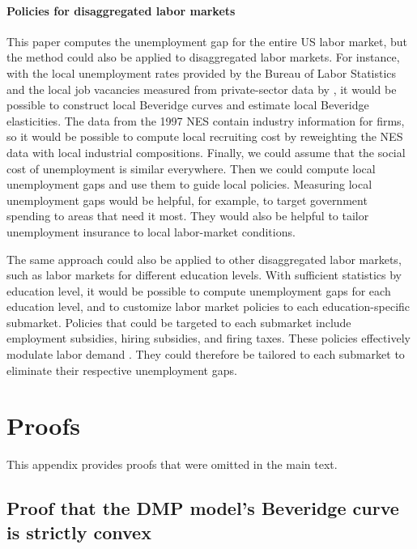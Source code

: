 \documentclass[letterpaper,12pt,leqno]{article}
\def\bib{../../bibliography/keynes.bib}
\begin{document}
\paragraph{Policies for disaggregated labor markets} This paper computes the unemployment gap for the entire US labor market, but the method could also be applied to disaggregated labor markets. For instance, with the local unemployment rates provided by the Bureau of Labor Statistics and the local job vacancies measured from private-sector data by , it would be possible to construct local Beveridge curves and estimate local Beveridge elasticities. The data from the 1997 NES contain industry information for firms, so it would be possible to compute local recruiting cost by reweighting the NES data with local industrial compositions. Finally, we could assume that the social cost of unemployment is similar everywhere. Then we could compute local unemployment gaps and use them to guide local policies. Measuring local unemployment gaps would be helpful, for example, to target government spending to areas that need it most. They would also be helpful to tailor  unemployment insurance to local labor-market conditions.

The same approach could also be applied to other disaggregated labor markets, such as labor markets for different education levels.  With sufficient statistics by education level, it would be possible to compute unemployment gaps for each education level, and to customize labor market policies to each education-specific submarket. Policies that could be targeted to each submarket include employment subsidies, hiring subsidies, and firing taxes. These policies effectively modulate labor demand . They could therefore be tailored to each submarket to eliminate their respective unemployment gaps.



\newpage
\appendix

\section{Proofs}\label{a:proofs}

This appendix provides proofs that were omitted in the main text.

\subsection{Proof that the DMP model's Beveridge curve is strictly convex}
\end{document}
